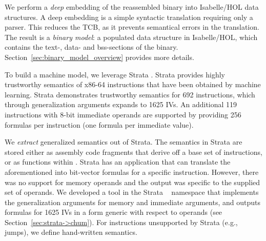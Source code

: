 We perform a \emph{deep} embedding of the reassembled binary into Isabelle/HOL data structures.
A deep embedding is a simple syntactic translation requiring only a parser.
This reduces the TCB, as it prevents semantical errors in the translation.
The result is a \emph{binary model}: a populated data structure in Isabelle/HOL, which contains the text-, data- and bss-sections of the binary.
Section~\ref{sec:binary_model_overview} provides more details.


To build a machine model, we leverage Strata \cite{heule2016}. 
Strata provides highly trustworthy semantics of x86-64 instructions that have been obtained by machine learning.
Strata demonstrates trustworthy semantics for 692 instructions, which through generalization arguments expands to 1625 IVs.
An additional 119 instructions with 8-bit immediate operands are supported by providing 256 formulas per instruction (one formula per immediate value).

We \emph{extract} generalized semantics out of Strata.
The semantics in Strata are stored either as assembly code fragments that derive off a base set of instructions, or as functions within \CC.
Strata has an application that can translate the aforementioned into bit-vector formulas for a specific instruction.
However, there was no support for memory operands and the output was specific to the supplied set of operands.
We developed a tool in the Strata \CC~ namespace that implements the generalization arguments for memory and immediate arguments, and outputs formulas for 1625 IVs in a form generic with respect to operands (see Section~\ref{sec:strata->chum}).
For instructions unsupported by Strata (e.g., jumps), we define hand-written semantics.

